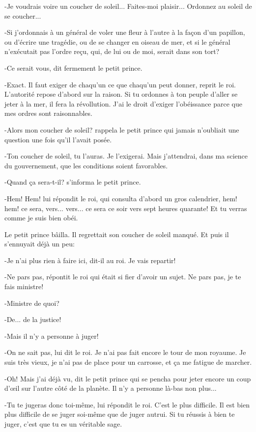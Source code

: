 \documentclass{report}
\begin{document}
\begin{paracol}{2}
-Je voudrais voire un coucher de soleil... Faites-moi plaisir... Ordonnez au soleil de se coucher...

-Si j'ordonnais à un général de voler une fleur à l'autre à la façon d'un papillon, ou d'écrire une tragédie, ou de se changer en oiseau de mer, et si le général n'exécutait pas l'ordre reçu, qui, de lui ou de moi, serait dans son tort?

-Ce serait vous, dit fermement le petit prince.

-Exact. Il faut exiger de chaqu'un ce que chaqu'un peut donner, reprit le roi. L'autorité repose d'abord sur la raison. Si tu ordonnes à ton peuple d'aller se jeter à la mer, il fera la révollution. J'ai le droit d'exiger l'obéissance parce que mes ordres sont raisonnables.

-Alors mon coucher de soleil? rappela le petit prince qui jamais n'oubliait une question une fois qu'il l'avait posée.

-Ton coucher de soleil, tu l'auras. Je l'exigerai. Mais j'attendrai, dans ma science du gouvernement, que les conditions soient favorables.

-Quand ça sera-t-il? s'informa le petit prince.

-Hem! Hem! lui répondit le roi, qui consulta d'abord un gros calendrier, hem! hem! ce sera, vers... vers... ce sera ce soir vers sept heures quarante! Et tu verras comme je suis bien obéi.

Le petit prince bâilla. Il regrettait son coucher de soleil manqué. Et puis il s'ennuyait déjà un peu:

-Je n'ai plus rien à faire ici, dit-il au roi. Je vais repartir!

-Ne pars pas, répontit le roi qui était si fier d'avoir un sujet. Ne pars pas, je te fais ministre!

-Ministre de quoi?

-De... de la justice!

-Mais il n'y a personne à juger!

-On ne sait pas, lui dit le roi. Je n'ai pas fait encore le tour de mon royaume. Je suis très vieux, je n'ai pas de place pour un carrosse, et ça me fatigue de marcher.

-Oh! Mais j'ai déjà vu, dit le petit prince qui se pencha pour jeter encore un coup d'œil sur l'autre côté de la planète. Il n'y a personne là-bas non plus...

-Tu te jugeras donc toi-même, lui répondit le roi. C'est le plus difficile. Il est bien plus difficile de se juger soi-même que de juger autrui. Si tu réussis à bien te juger, c'est que tu es un véritable sage.


\end{paracol}
\end{document}
